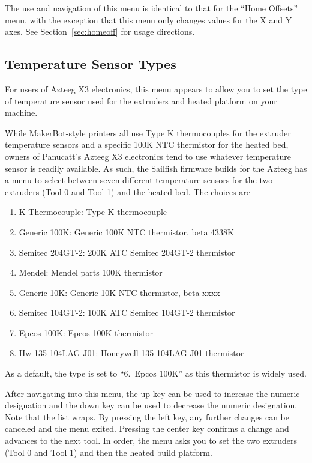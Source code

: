 The use and navigation of this menu is identical to that for the ``Home Offsets'' menu, with the exception that this menu only changes values for the X and Y axes.  See Section~\ref{sec:homeoff} for usage directions.


\subsection{Temperature Sensor Types} \label{sec:tempsensor}

For users of Azteeg X3 electronics, this menu appears to allow you to set the type of temperature sensor used for the extruders and heated platform on your machine.

While MakerBot-style printers all use Type K thermocouples for the extruder temperature sensors and a specific 100K NTC thermistor for the heated bed, owners of Panucatt's Azteeg X3 electronics tend to use whatever temperature sensor is readily available.  As such, the Sailfish firmware builds for the Azteeg has a menu to select between seven different temperature sensors for the two extruders (Tool 0 and Tool 1) and the heated bed.  The choices are
\begin{enumerate}
\item K Thermocouple: Type K thermocouple
\item Generic 100K: Generic 100K NTC thermistor, beta 4338K
\item Semitec 204GT-2: 200K ATC Semitec 204GT-2 thermistor
\item Mendel: Mendel parts 100K thermistor
\item Generic 10K: Generic 10K NTC thermistor, beta xxxx
\item Semitec 104GT-2: 100K ATC Semitec 104GT-2 thermistor
\item Epcos 100K: Epcos 100K thermistor
\item Hw 135-104LAG-J01: Honeywell 135-104LAG-J01 thermistor
\end{enumerate}

As a default, the type is set to ``6.\ Epcos 100K'' as this thermistor is widely used.

After navigating into this menu, the up key can be used to increase the numeric designation and the down key can be used to decrease the numeric designation. Note that the list wraps. By pressing the left key, any further changes can be canceled and the menu exited. Pressing the center key confirms a change and advances to the next tool. In order, the menu asks you to set the two extruders (Tool 0 and Tool 1) and then the heated build platform.

